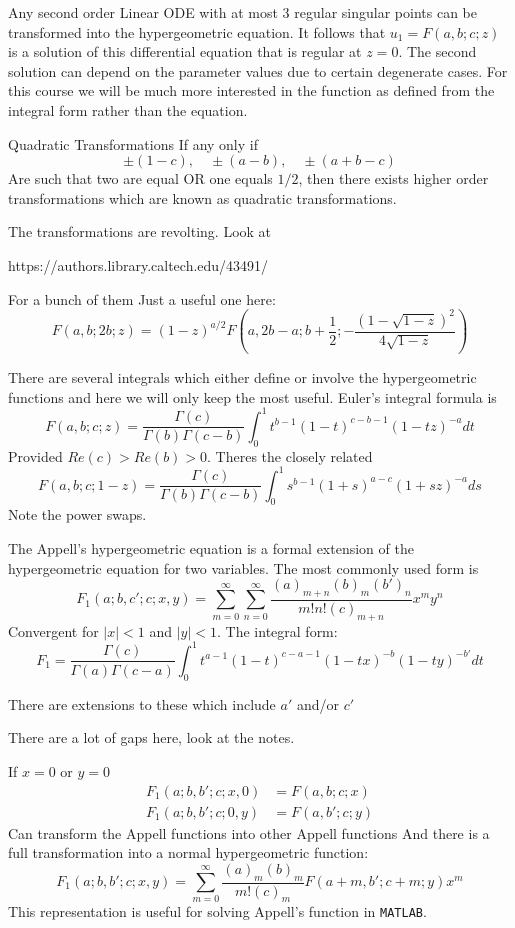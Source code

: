 \documentclass{E:/Documents/Latex/myassignment}
\begin{document}
Any second order Linear ODE with at most 3 regular singular points can be transformed into the hypergeometric equation. It follows that 
$u_1 = F(a,b;c;z)$ is a solution of this differential equation that is regular at $z=0$. The second solution can depend on the parameter values due to certain degenerate cases. For this course we will be much more interested in the function as defined from the integral form rather than the equation.



Quadratic Transformations
If any only if
\[\pm(1-c),\quad \pm(a-b), \quad \pm(a+b-c)\]
Are such that two are equal OR one equals $1/2$, then there exists higher order transformations which are known as quadratic transformations.

The transformations are revolting.
Look at 


https://authors.library.caltech.edu/43491/


For a bunch of them
Just a useful one here:
\[F(a,b;2b;z) = (1-z)^{a/2} F\left(a,2b-a;b+\frac12; -\frac{(1-\sqrt{1-z})^2}{4\sqrt{1-z}}\right)\]

There are several integrals which either define or involve the hypergeometric functions and here we will only keep the most useful. Euler's integral formula is
\[F(a,b;c;z) = \frac{\Gamma(c)}{\Gamma(b)\Gamma(c-b)} \int_0^1 t^{b-1}(1-t)^{c-b-1}(1-tz)^{-a} dt\]
Provided $Re(c) > Re(b) > 0$. Theres the closely related
\[F(a,b;c;1-z) = \frac{\Gamma(c)}{\Gamma(b)\Gamma(c-b)} \int_0^1 s^{b-1}(1+s)^{a-c}(1+sz)^{-a} ds\]
Note the power swaps.

The Appell's hypergeometric equation is a formal extension of the hypergeometric equation for two variables. The most commonly used form is
\[F_1(a;b,c';c;x,y) = \sum_{m=0}^\infty \sum_{n=0}^\infty \frac{(a)_{m+n}(b)_m (b')_n}{m!n!(c)_{m+n}} x^my^n\]
Convergent for $|x|<1$ and $|y|<1$. The integral form:
\[F_1 = \frac{\Gamma(c)}{\Gamma(a)\Gamma(c-a)} \int_0^1 t^{a-1}(1-t)^{c-a-1}(1-tx)^{-b}(1-ty)^{-b'} dt\]

There are extensions to these which include $a'$ and/or $c'$

There are a lot of gaps here, look at the notes.

If $x=0$ or $y = 0$ 
\begin{align*}
	F_1(a;b,b';c;x,0) &= F(a,b;c;x)\\
	F_1(a;b,b';c;0,y) &= F(a,b';c;y)
\end{align*}
Can transform the Appell functions into other Appell functions
And there is a full transformation into a normal hypergeometric function:
\[F_1(a;b,b';c;x,y) = \sum_{m=0}^\infty \frac{(a)_m(b)_m}{m!(c)_m} F(a+m,b';c+m;y) x^m\]
This representation is useful for solving Appell's function in \verb|MATLAB|.
\end{document}
